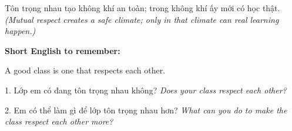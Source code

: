 \begin{baihoc}
Tôn trọng nhau tạo không khí an toàn; trong không khí ấy mới có học thật.
\textit{(Mutual respect creates a safe climate; only in that climate can real learning happen.)}
\end{baihoc}

\begin{ghinhoanh}
\textbf{Short English to remember:}

A good class is one that respects each other.

\end{ghinhoanh}

\begin{tuhocnhanh}
1. Lớp em có đang tôn trọng nhau không? \textit{Does your class respect each other?}

2. Em có thể làm gì để lớp tôn trọng nhau hơn? \textit{What can you do to make the class respect each other more?}
\end{tuhocnhanh}
\ngancach
